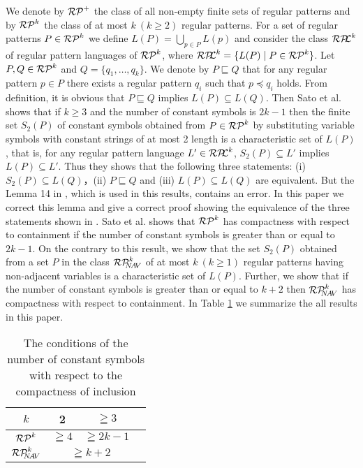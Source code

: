We denote by $\mathcal{RP}^{+}$ the class of all non-empty finite sets of regular patterns and
by $\mathcal{RP}^{k}$ the class of at most $k~(k\geq 2)$ regular patterns.
For a set of regular patterns $P\in\mathcal{RP}^{k}$ we define $L(P)=\bigcup_{p\in P}L(p)$ and consider the class $\mathcal{RP\!\!L}^{k}$ of regular pattern languages of $\mathcal{RP}^{k}$, where $\mathcal{RP\!\!L}^{k} = \{L(P) \mid P\in \mathcal{RP}^{k}\}$.
Let $P,Q\in \mathcal{RP}^{k}$ and $Q= \{ q_{1}, \ldots, q_{k} \}$.
We denote by $P\sqsubseteq Q$ that for any regular pattern $p\in P$ there exists a regular pattern $q_{i}$ such that $p\preceq q_{i}$ holds.
From definition, it is obvious that $P \sqsubseteq Q$ implies $L(P)\subseteq L(Q)$.
%
Then Sato et al. \cite{Sato1} shows that 
if $k \ge 3$ and the number of constant symbols is $2k-1$ then 
the finite set $S_2(P)$ of constant symbols obtained from $P\in \mathcal{RP}^{k}$ by substituting variable symbols with constant strings of at most 2 length is a characteristic set of $L(P)$, 
that is, for any regular pattern language $L'\in \mathcal{RP\!\!L}^{k}$, $S_2(P) \subseteq L'$ implies $L(P)\subseteq L'$.
Thus they shows that the following three statements: (i) $S_2(P) \subseteq L(Q)$，(ii) $P\sqsubseteq Q$ and (iii) $L(P)\subseteq L(Q)$ are equivalent. 
%
But the Lemma 14 in \cite{Sato1}, which is used in this results, contains an error.
In this paper we correct this lemma and give a correct proof showing the equivalence of the three statements shown in \cite{Sato1}.
Sato et al. \cite{Sato1} shows that $\mathcal{RP}^{k}$ has compactness with respect to containment if the number of constant symbols is greater than or equal to $2k-1$.
On the contrary to this result, we show that the set $S_2(P)$ obtained from a set $P$ in the class $\mathcal{RP}^{k}_{\!\!\!N\!A\!V}$ of at most $k~(k\ge 1)$ regular patterns having non-adjacent variables is a characteristic set of $L(P)$.
Further, we show that if the number of constant symbols is greater than or equal to $k+2$ then $\mathcal{RP}^{k}_{\!\!\!N\!A\!V}$ has compactness with respect to containment.
In Table \ref{table1} we summarize the all results in this paper.


\begin{table}[hbt]
\begin{center}
\vspace{-0.4cm}
\caption{The conditions of the number of constant symbols with respect to the compactness of inclusion}
\label{table1}
\begin{tabular}{llll}
\hline
\multicolumn{1}{|c|}{$k$}   & \multicolumn{1}{c|}{2}                            & \multicolumn{1}{c|}{$ \geqq 3$} \\ 
\hline
\hline
\multicolumn{1}{|c|}{$\mathcal{RP}^{k}$} & \multicolumn{1}{c|}{$ \geqq 4$}                          & \multicolumn{1}{c|}{$ \geqq 2k-1$} \\ \hline
\multicolumn{1}{|c|}{$\mathcal{RP}^{k}_{\!\!\!N\!A\!V}$} & \multicolumn{2}{c|}{$ \geqq k+2$} \\ \hline
\end{tabular}
\vspace*{-1em}
\end{center}
\end{table}


